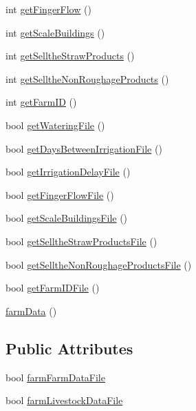 \begin{DoxyCompactItemize}
int \hyperlink{classfarm_data_a31e15da81a55923b46809f1b1a49a0e0}{getFingerFlow} ()
\item 
int \hyperlink{classfarm_data_a61a7f06c1a4a1e8cb9918021fd6ae732}{getScaleBuildings} ()
\item 
int \hyperlink{classfarm_data_a0fcf159bb05fade89e597c27e9f8d238}{getSelltheStrawProducts} ()
\item 
int \hyperlink{classfarm_data_a377fd256f7acb7f9f88783e9c83a2a1a}{getSelltheNonRoughageProducts} ()
\item 
int \hyperlink{classfarm_data_a3a621508744b8fde46e99cdedfff3cd9}{getFarmID} ()
\item 
bool \hyperlink{classfarm_data_a2647fba9e3eeb43dc9bb4c3df245f7f1}{getWateringFile} ()
\item 
bool \hyperlink{classfarm_data_a8e562556a301cf02479e3d606d2f9969}{getDaysBetweenIrrigationFile} ()
\item 
bool \hyperlink{classfarm_data_a9fbfd725ccfe33d7288801d1e5c4d099}{getIrrigationDelayFile} ()
\item 
bool \hyperlink{classfarm_data_ac827ff6838ba8e2b81ab4bffaf6223c3}{getFingerFlowFile} ()
\item 
bool \hyperlink{classfarm_data_a6e3a6f28c3ff7f3a049c2418e1770852}{getScaleBuildingsFile} ()
\item 
bool \hyperlink{classfarm_data_ac3fac71cd2212a99fc08a5ce48766709}{getSelltheStrawProductsFile} ()
\item 
bool \hyperlink{classfarm_data_ab691a5ffba157871b2562f60aa5321f7}{getSelltheNonRoughageProductsFile} ()
\item 
bool \hyperlink{classfarm_data_a66670cfc19135aefe2f7cecef4299f49}{getFarmIDFile} ()
\item 
\hyperlink{classfarm_data_afd7275ecdb30721e5f6221026b4c56ba}{farmData} ()
\end{DoxyCompactItemize}
\subsection*{Public Attributes}
\begin{DoxyCompactItemize}
\item 
bool \hyperlink{classfarm_data_a978fb6c1e7912cc1629ebc07f4633065}{farmFarmDataFile}
\item 
bool \hyperlink{classfarm_data_affca61735fb74aa47fe3047f5f2c1a5d}{farmLivestockDataFile}
\end{DoxyCompactItemize}

